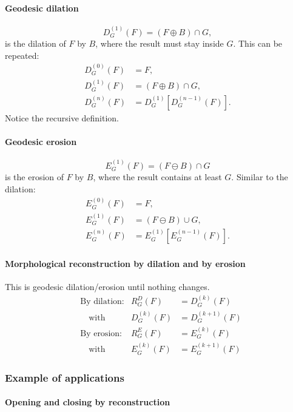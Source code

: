 \paragraph{Geodesic dilation}
\[
	D_G^{(1)}(F) = (F\oplus B)\cap G,
\]
is the dilation of $F$ by $B$, where the result must stay inside $G$.
This can be repeated:
\begin{align*}
	D_G^{(0)}(F) &= F, \\
	D_G^{(1)}(F) &= (F\oplus B)\cap G, \\
	D_G^{(n)}(F) &= D_G^{(1)}[D_G^{(n-1)}(F)].
\end{align*}
Notice the recursive definition.

\paragraph{Geodesic erosion}
	\[
		E_G^{(1)}(F) = (F \ominus B) \cap G
	\]
is the erosion of $F$ by $B$, where the result contains at least $G$. Similar to the dilation:
\begin{align*}
  E_G^{(0)}(F) &= F, \\
	E_G^{(1)}(F) &= (F\ominus B)\cup G, \\
	E_G^{(n)}(F) &= E_G^{(1)}[E_G^{(n-1)}(F)].
\end{align*}

\paragraph{Morphological reconstruction by dilation and by erosion}
This is geodesic dilation/erosion until nothing changes.
\begin{align*}
	&\text{By dilation:} & R_G^D(F) &= D_G^{(k)}(F) \\
		&\quad \text{with} & D_G^{(k)}(F) &= D_G^{(k+1)}(F) \\
	&\text{By erosion:}  & R_G^E(F) &= E_G^{(k)}(F) \\
		&\quad \text{with} & E_G^{(k)}(F) &= E_G^{(k+1)}(F)
\end{align*}

\subsubsection{Example of applications}

\paragraph{Opening and closing by reconstruction}

